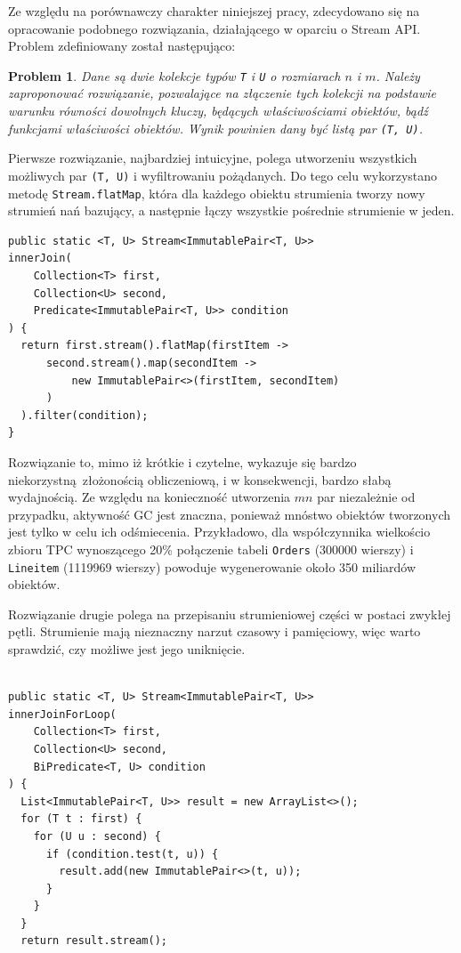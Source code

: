 \documentclass[12pt,twoside,openright]{extarticle}
\newtheorem{theorem}{Problem}
\begin{document}
    Ze względu na porównawczy charakter niniejszej pracy, zdecydowano się na opracowanie podobnego rozwiązania, działającego w oparciu o Stream API. Problem zdefiniowany został następująco:

\begin{theorem}
    Dane są dwie kolekcje typów \texttt{T} i \texttt{U} o rozmiarach $ n $ i $ m $. Należy zaproponować rozwiązanie, pozwalające na złączenie tych kolekcji na podstawie warunku równości dowolnych kluczy, będących właściwościami obiektów, bądź funkcjami właściwości obiektów. Wynik powinien dany być listą par \texttt{(T, U)}.
\end{theorem}

    Pierwsze rozwiązanie, najbardziej intuicyjne, polega utworzeniu wszystkich możliwych par \texttt{(T, U)} i wyfiltrowaniu pożądanych. Do tego celu wykorzystano metodę \texttt{Stream.flatMap}, która dla każdego obiektu strumienia tworzy nowy strumień nań bazujący, a następnie łączy wszystkie pośrednie strumienie w jeden.

\begin{lstlisting}[label=join1, caption=Rozwiązanie nr 1]
public static <T, U> Stream<ImmutablePair<T, U>>
innerJoin(
    Collection<T> first,
    Collection<U> second,
    Predicate<ImmutablePair<T, U>> condition
) {
  return first.stream().flatMap(firstItem ->
      second.stream().map(secondItem ->
          new ImmutablePair<>(firstItem, secondItem)
      )
  ).filter(condition);
}

\end{lstlisting}

    Rozwiązanie to, mimo iż krótkie i czytelne, wykazuje się bardzo niekorzystną złożonością obliczeniową, i w konsekwencji, bardzo słabą wydajnością. Ze względu na konieczność utworzenia $ mn $ par niezależnie od przypadku, aktywność GC jest znaczna, ponieważ mnóstwo obiektów tworzonych jest tylko w celu ich odśmiecenia. Przykładowo, dla współczynnika wielkościo zbioru TPC wynoszącego 20\% połączenie tabeli \texttt{Orders} (300000 wierszy) i \texttt{Lineitem} (1119969 wierszy) powoduje wygenerowanie około 350 miliardów obiektów.

    Rozwiązanie drugie polega na przepisaniu strumieniowej części w postaci zwykłej pętli. Strumienie mają nieznaczny narzut czasowy i pamięciowy, więc warto sprawdzić, czy możliwe jest jego uniknięcie.

\begin{lstlisting}[label=join2, caption=Rozwiązanie nr 2]

public static <T, U> Stream<ImmutablePair<T, U>>
innerJoinForLoop(
    Collection<T> first,
    Collection<U> second,
    BiPredicate<T, U> condition
) {
  List<ImmutablePair<T, U>> result = new ArrayList<>();
  for (T t : first) {
    for (U u : second) {
      if (condition.test(t, u)) {
        result.add(new ImmutablePair<>(t, u));
      }
    }
  }
  return result.stream();
    

\end{lstlisting}
\end{document}
